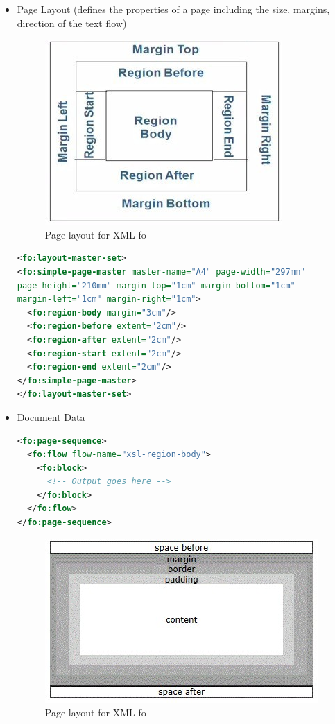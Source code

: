 \begin{itemize}
\item Page Layout (defines the properties of a page including the size, margins, direction of the text flow) 
\begin{figure}[h!]
\centering
\label{fig:layoutxmlfo}
\caption{Page layout for XML fo}
\includegraphics[origin=c]{images/layoutxmlfo.jpg}
\end{figure}
\begin{lstlisting}[language=xml]
<fo:layout-master-set>
<fo:simple-page-master master-name="A4" page-width="297mm"
page-height="210mm" margin-top="1cm" margin-bottom="1cm"
margin-left="1cm" margin-right="1cm">
  <fo:region-body margin="3cm"/>
  <fo:region-before extent="2cm"/>
  <fo:region-after extent="2cm"/>
  <fo:region-start extent="2cm"/>
  <fo:region-end extent="2cm"/>
</fo:simple-page-master>
</fo:layout-master-set>
\end{lstlisting}
\item Document Data
\begin{lstlisting}[language=xml]
<fo:page-sequence>
  <fo:flow flow-name="xsl-region-body">
    <fo:block>
      <!-- Output goes here -->
    </fo:block>
  </fo:flow>
</fo:page-sequence>
\end{lstlisting}
\begin{figure}[h!]
\centering
\label{fig:fo2}
\caption{Page layout for XML fo}
\includegraphics[origin=c]{images/fo2.jpg}
\end{figure}
\end{itemize}
